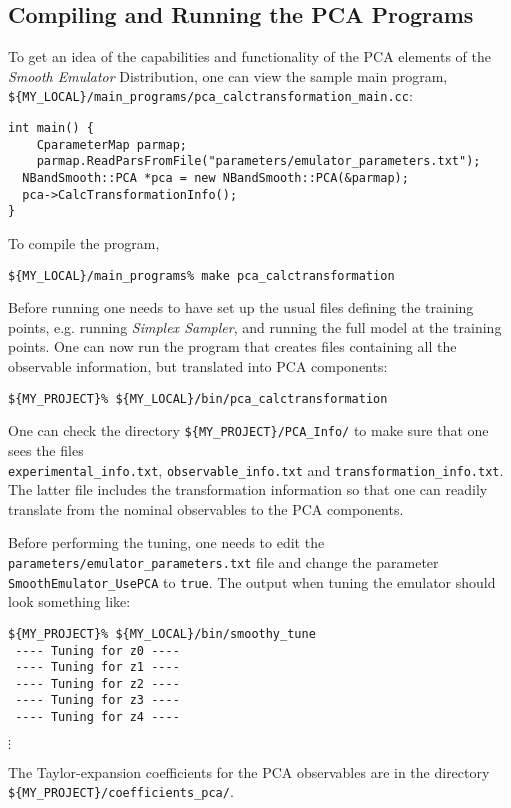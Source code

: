 \documentclass[UserManual.tex]{subfiles}
\begin{document}
\subsection{Compiling and Running the PCA Programs}
To get an idea of the capabilities and functionality of the PCA elements of the {\it Smooth Emulator} Distribution, one can view the sample main program,\\
{\tt \$\{MY\_LOCAL\}/main\_programs/pca\_calctransformation\_main.cc}:
{\tt\begin{verbatim}
int main() {
	CparameterMap parmap;
	parmap.ReadParsFromFile("parameters/emulator_parameters.txt");
  NBandSmooth::PCA *pca = new NBandSmooth::PCA(&parmap);
  pca->CalcTransformationInfo();
}
\end{verbatim}}
To compile the program,
{\tt\begin{verbatim}
${MY_LOCAL}/main_programs% make pca_calctransformation
\end{verbatim}}
Before running one needs to have set up the usual files defining the training points, e.g. running {\it Simplex Sampler}, and running the full model at the training points. One can now run the program that creates files containing all the observable information, but translated into PCA components:
{\tt\begin{verbatim}
${MY_PROJECT}% ${MY_LOCAL}/bin/pca_calctransformation
\end{verbatim}}
One can check the directory {\tt \$\{MY\_PROJECT\}/PCA\_Info/} to make sure that one sees the files\\{\tt experimental\_info.txt}, {\tt observable\_info.txt} and {\tt transformation\_info.txt}. The latter file includes the transformation information so that one can readily translate from the nominal observables to the PCA components.

Before performing the tuning, one needs to edit the {\tt parameters/emulator\_parameters.txt} file and change the parameter {\tt SmoothEmulator\_UsePCA} to {\tt true}. The output when tuning the emulator should look something like:
{\tt\begin{verbatim}
${MY_PROJECT}% ${MY_LOCAL}/bin/smoothy_tune
 ---- Tuning for z0 ----
 ---- Tuning for z1 ----
 ---- Tuning for z2 ----
 ---- Tuning for z3 ----
 ---- Tuning for z4 ----
\end{verbatim}} \vspace*{-16pt}
\hspace*{35pt}$\vdots$

The Taylor-expansion coefficients for the PCA observables are in the directory {\tt \$\{MY\_PROJECT\}/coefficients\_pca/}. 
\end{document}
